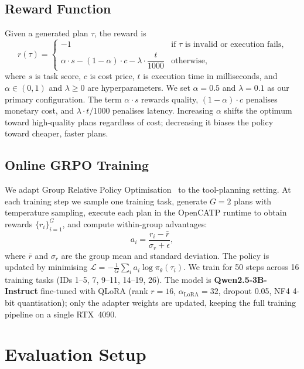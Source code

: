 \documentclass[10pt,twocolumn]{article}
\begin{document}
\subsection{Reward Function}
Given a generated plan $\tau$, the reward is
\begin{equation}
  r(\tau) =
  \begin{cases}
    -1 & \text{if $\tau$ is invalid or execution fails,} \\[4pt]
    \alpha \cdot s - (1{-}\alpha) \cdot c - \lambda \cdot \dfrac{t}{1000}
    & \text{otherwise,}
  \end{cases}
  \label{eq:reward}
\end{equation}
where $s$ is task score, $c$ is cost price, $t$ is execution time in
milliseconds, and $\alpha \in (0,1)$ and $\lambda \geq 0$ are
hyperparameters.
We set $\alpha{=}0.5$ and $\lambda{=}0.1$ as our primary configuration.
The term $\alpha \cdot s$ rewards quality, $(1-\alpha) \cdot c$ penalises
monetary cost, and $\lambda \cdot t/1000$ penalises latency.
Increasing $\alpha$ shifts the optimum toward high-quality plans regardless
of cost; decreasing it biases the policy toward cheaper, faster plans.

\subsection{Online GRPO Training}
We adapt Group Relative Policy Optimisation~\cite{shao2024deepseekmath}
to the tool-planning setting.
At each training step we sample one training task, generate $G{=}2$ plans
with temperature sampling, execute each plan in the OpenCATP runtime to
obtain rewards $\{r_i\}_{i=1}^G$, and compute within-group advantages:
\begin{equation}
  a_i = \frac{r_i - \bar{r}}{\sigma_r + \epsilon},
\end{equation}
where $\bar{r}$ and $\sigma_r$ are the group mean and standard deviation.
The policy is updated by minimising
$\mathcal{L} = -\frac{1}{G}\sum_i a_i \log\pi_\theta(\tau_i)$.
We train for 50 steps across 16 training tasks
(IDs 1--5, 7, 9--11, 14--19, 26).
The model is \textbf{Qwen2.5-3B-Instruct} fine-tuned with QLoRA
(rank $r{=}16$, $\alpha_\text{LoRA}{=}32$, dropout 0.05, NF4 4-bit
quantisation); only the adapter weights are updated, keeping the full
training pipeline on a single RTX~4090.

\section{Evaluation Setup}
\end{document}
